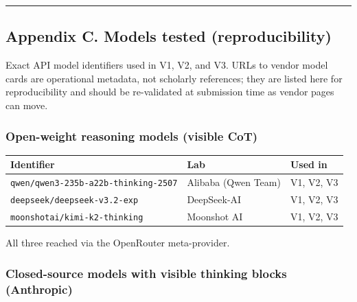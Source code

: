 \documentclass[
]{article}
\begin{document}
\begin{center}\rule{0.5\linewidth}{0.5pt}\end{center}

\subsection{Appendix C. Models tested
(reproducibility)}\label{appendix-c.-models-tested-reproducibility}

Exact API model identifiers used in V1, V2, and V3. URLs to vendor model
cards are operational metadata, not scholarly references; they are
listed here for reproducibility and should be re-validated at submission
time as vendor pages can move.

\subsubsection{Open-weight reasoning models (visible
CoT)}\label{open-weight-reasoning-models-visible-cot}

\begin{longtable}[]{@{}
  >{\raggedright\arraybackslash}p{}
  >{\raggedright\arraybackslash}p{}
  >{\raggedright\arraybackslash}p{}@{}}
\toprule\noalign{}
\begin{minipage}[b]{\linewidth}\raggedright
Identifier
\end{minipage} & \begin{minipage}[b]{\linewidth}\raggedright
Lab
\end{minipage} & \begin{minipage}[b]{\linewidth}\raggedright
Used in
\end{minipage} \\
\midrule\noalign{}
\endhead
\bottomrule\noalign{}
\endlastfoot
\texttt{qwen/qwen3-235b-a22b-thinking-2507} & Alibaba (Qwen Team) & V1,
V2, V3 \\
\texttt{deepseek/deepseek-v3.2-exp} & DeepSeek-AI & V1, V2, V3 \\
\texttt{moonshotai/kimi-k2-thinking} & Moonshot AI & V1, V2, V3 \\
\end{longtable}

All three reached via the OpenRouter meta-provider.

\subsubsection{Closed-source models with visible thinking blocks
(Anthropic)}\label{closed-source-models-with-visible-thinking-blocks-anthropic}
\end{document}
